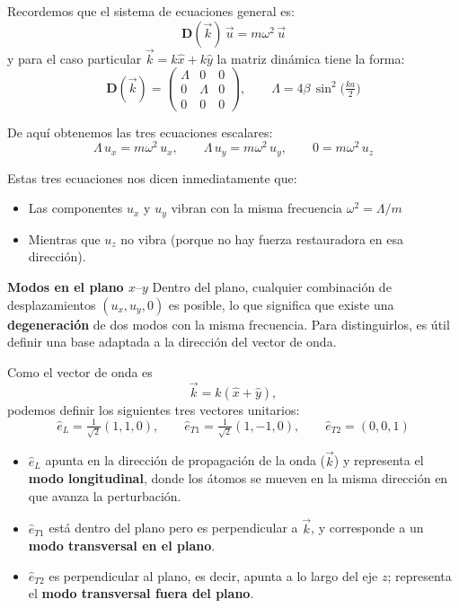 \documentclass{article}
\begin{document}
\medskip
Recordemos que el sistema de ecuaciones general es:
\[
\mathbf D(\vec k)\,\vec u = m\omega^2\,\vec u
\]
y para el caso particular \(\vec k = k\hat x + k\hat y\) la matriz dinámica tiene la forma:
\begin{equation}
\boxed{
\mathbf D(\vec k)=
\begin{pmatrix}
\Lambda & 0 & 0\\[2pt]
0 & \Lambda & 0\\[2pt]
0 & 0 & 0
\end{pmatrix}},
\qquad
\Lambda = 4\beta\,\sin^2\!\Big(\tfrac{ka}{2}\Big)
\label{eq:f_matriz_dinamica}
\end{equation}

De aquí obtenemos las tres ecuaciones escalares:
\begin{equation}
\Lambda\,u_x = m\omega^2\,u_x, 
\qquad
\Lambda\,u_y = m\omega^2\,u_y, 
\qquad
0 = m\omega^2\,u_z
\label{eq:f_ecuaciones_componentes}
\end{equation}

Estas tres ecuaciones nos dicen inmediatamente que:

\begin{itemize}
\item[$\bullet$] Las componentes \(u_x\) y \(u_y\) vibran con la misma frecuencia \(\omega^2 = \Lambda/m\)
\item[$\bullet$] Mientras que \(u_z\) no vibra (porque no hay fuerza restauradora en esa dirección).
\end{itemize}




\medskip
\textcolor{Tarawera}{\textbf{Modos en el plano \(x\text{–}y\)}}  
Dentro del plano, cualquier combinación de desplazamientos \((u_x,u_y,0)\) es posible,  
lo que significa que existe una \textbf{degeneración} de dos modos con la misma frecuencia.  
Para distinguirlos, es útil definir una base adaptada a la dirección del vector de onda.

Como el vector de onda es
\[
\vec k = k(\hat x + \hat y),
\]
podemos definir los siguientes tres vectores unitarios:
\begin{equation}
\boxed{
\hat e_L = \tfrac{1}{\sqrt2}(1,1,0),\qquad
\hat e_{T1} = \tfrac{1}{\sqrt2}(1,-1,0),\qquad
\hat e_{T2} = (0,0,1)
}
\label{eq:f_vectores_polarizacion}
\end{equation}


\begin{itemize}
\item[$\bullet$] \(\hat e_L\) apunta en la dirección de propagación de la onda (\(\vec k\))  
  y representa el \textbf{modo longitudinal}, donde los átomos se mueven en la misma dirección en que avanza la perturbación.
\item[$\bullet$] \(\hat e_{T1}\) está dentro del plano pero es perpendicular a \(\vec k\),  
  y corresponde a un \textbf{modo transversal en el plano}.\\
  \item[$\bullet$] \(\hat e_{T2}\) es perpendicular al plano, es decir, apunta a lo largo del eje \(z\);  
  representa el \textbf{modo transversal fuera del plano}.
\end{itemize}
\end{document}
